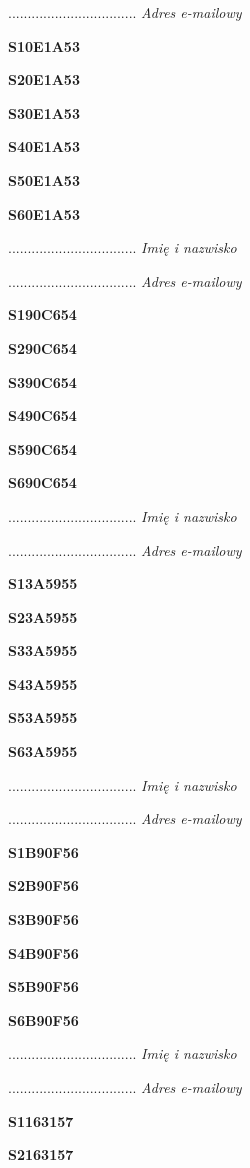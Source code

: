 .................................
\textit{Adres e-mailowy}

\Large \textbf{S10E1A53}

\Large \textbf{S20E1A53}

\Large \textbf{S30E1A53}

\Large \textbf{S40E1A53}

\Large \textbf{S50E1A53}

\Large \textbf{S60E1A53}

.................................
\textit{Imię i nazwisko}

.................................
\textit{Adres e-mailowy}

\Large \textbf{S190C654}

\Large \textbf{S290C654}

\Large \textbf{S390C654}

\Large \textbf{S490C654}

\Large \textbf{S590C654}

\Large \textbf{S690C654}

.................................
\textit{Imię i nazwisko}

.................................
\textit{Adres e-mailowy}

\Large \textbf{S13A5955}

\Large \textbf{S23A5955}

\Large \textbf{S33A5955}

\Large \textbf{S43A5955}

\Large \textbf{S53A5955}

\Large \textbf{S63A5955}

.................................
\textit{Imię i nazwisko}

.................................
\textit{Adres e-mailowy}

\Large \textbf{S1B90F56}

\Large \textbf{S2B90F56}

\Large \textbf{S3B90F56}

\Large \textbf{S4B90F56}

\Large \textbf{S5B90F56}

\Large \textbf{S6B90F56}

.................................
\textit{Imię i nazwisko}

.................................
\textit{Adres e-mailowy}

\Large \textbf{S1163157}

\Large \textbf{S2163157}

